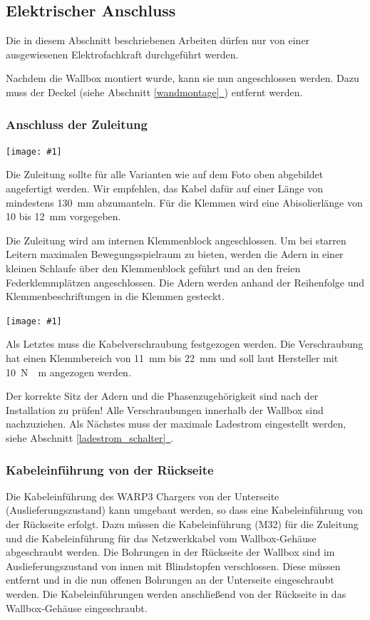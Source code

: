 \documentclass[a4paper,10pt]{article}
\newcommand{\hint}[1]{\begin{tcolorbox}[colback=boxgray,colframe=black,coltext=
white,title=Hinweis,left*=2mm,right*=2mm,boxsep=1mm,bottom=1mm,top=1mm]#1\end{tcolorbox}}
\newcommand{\gfx}[1]{\texttt{[image: \#1]}}
\newcommand*{\fullref}[1]{Abschnitt \hyperref[{#1}]{\ref*{#1}~\nameref*{#1}}}
\begin{document}
\begin{multicols*}{2}
    \subsection{Elektrischer Anschluss}
    \hint{Die in diesem Abschnitt beschriebenen Arbeiten dürfen nur von einer ausgewiesenen
        Elektrofachkraft durchgeführt werden.}

    Nachdem die Wallbox montiert wurde, kann sie nun angeschlossen werden. Dazu
    muss der Deckel (siehe \fullref{wandmontage}) entfernt werden.

    \subsubsection{Anschluss der Zuleitung}
    \gfx{./img_warp3/resized/warp_cable_cut_ready}

    Die Zuleitung sollte für alle Varianten wie auf dem Foto oben abgebildet
    angefertigt werden. Wir empfehlen, das Kabel dafür auf einer Länge von
	mindestens \SI{130}{\milli\meter} abzumanteln. Für die Klemmen wird eine
    Abisolierlänge von 10 bis \SI{12}{\milli\meter} vorgegeben.

    Die Zuleitung wird am internen Klemmenblock
    angeschlossen. Um bei starren Leitern maximalen Bewegungsspielraum zu bieten,
    werden die Adern in einer kleinen Schlaufe über den Klemmenblock geführt
	und an den freien Federklemmplätzen angeschlossen. Die Adern werden anhand der Reihenfolge und
    Klemmenbeschriftungen in die Klemmen gesteckt.

    \gfx{./img_warp3/resized/warp3_smart_open_connected}

    Als Letztes muss die Kabelverschraubung festgezogen werden. Die Verschraubung
    hat einen Klemmbereich von \SI{11}{\milli\meter} bis \SI{22}{\milli\meter} und soll laut Hersteller mit
    \SI{10}{\newton{}\meter} angezogen werden.

    Der korrekte Sitz der Adern und die Phasenzugehörigkeit sind nach der
    Installation zu prüfen! Alle Verschraubungen innerhalb der Wallbox sind nachzuziehen.
    Als Nächstes muss der maximale Ladestrom eingestellt werden, siehe
	\fullref{ladestrom_schalter}.

    \subsubsection{Kabeleinführung von der Rückseite}
    Die Kabeleinführung des WARP3 Chargers von der Unterseite
    (Auslieferungszustand) kann umgebaut werden, so dass eine Kabeleinführung von der
    Rückseite erfolgt. Dazu müssen die Kabeleinführung (M32) für die Zuleitung und die
    Kabeleinführung für das Netzwerkkabel vom Wallbox-Gehäuse abgeschraubt
    werden. Die Bohrungen in der Rückseite der Wallbox sind im
    Auslieferungszustand von innen mit Blindstopfen verschlossen.
    Diese müssen entfernt und in die nun offenen Bohrungen an der Unterseite
    eingeschraubt werden. Die Kabeleinführungen werden anschließend von
    der Rückseite in das Wallbox-Gehäuse eingeschraubt.


\end{multicols*}
\end{document}
